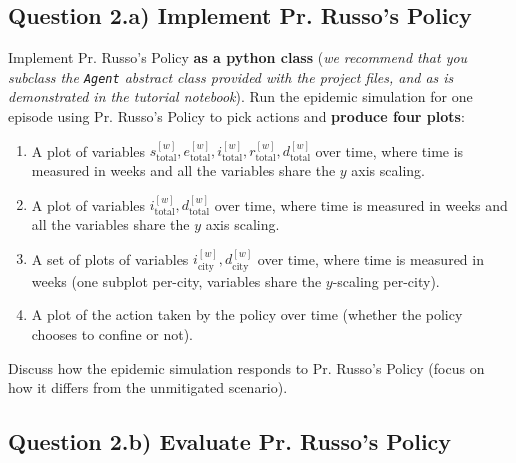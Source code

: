 \documentclass[10pt]{article}
\begin{document}
\subsection*{Question 2.a) Implement Pr. Russo's Policy}

Implement Pr. Russo's Policy \textbf{as a python class} (\textit{we recommend that you subclass the \texttt{Agent} abstract class provided with the project files, and as is demonstrated in the tutorial notebook}). Run the epidemic simulation for one episode using Pr. Russo's Policy to pick actions and \textbf{produce four plots}:
\begin{enumerate}
  \item A plot of variables $s_\text{total}^{[w]},e_\text{total}^{[w]},i_\text{total}^{[w]},r_\text{total}^{[w]},d_\text{total}^{[w]}$ over time, where time is measured in weeks and all the variables share the $y$ axis scaling.
  \item A plot of variables $i_\text{total}^{[w]},d_\text{total}^{[w]}$ over time, where time is measured in weeks and all the variables share the $y$ axis scaling.
  \item A set of plots of variables $i_\text{city}^{[w]},d_\text{city}^{[w]}$ over time, where time is measured in weeks (one subplot per-city, variables share the $y$-scaling per-city).
  \item A plot of the action taken by the policy over time (whether the policy chooses to confine or not).
\end{enumerate}

Discuss how the epidemic simulation responds to Pr. Russo's Policy (focus on how it differs from the unmitigated scenario).


\subsection*{Question 2.b) Evaluate Pr. Russo's Policy}
\end{document}
